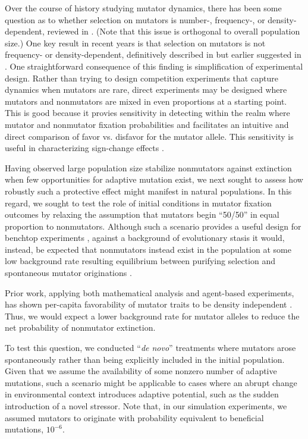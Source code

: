 Over the course of history studying mutator dynamics, there has been some question as to whether selection on mutators is number-, frequency-, or density-dependent, reviewed in \citep{raynes2019selection}.
(Note that this issue is orthogonal to overall population size.)
One key result in recent years is that selection on mutators is not frequency- or density-dependent, definitively described in \citep{raynes2019selection} but earlier suggested in \citep{wylie2009fixation}.
One straightforward consequence of this finding is simplification of experimental design.
Rather than trying to design competition experiments that capture dynamics when mutators are rare, direct experiments may be designed where mutators and nonmutators are mixed in even proportions at a starting point.
This is good because it provies sensitivity in detecting within the realm where mutator and nonmutator fixation probabilities and facilitates an intuitive and direct comparison of favor vs. disfavor for the mutator allele.
This sensitivity is useful in characterizing sign-change effects \citep{raynes2019selection}.



Having observed large population size stabilize nonmutators against extinction when few opportunities for adaptive mutation exist, we next sought to assess how robustly such a protective effect might manifest in natural populations.
In this regard, we sought to test the role of initial conditions in mutator fixation outcomes by relaxing the assumption that mutators begin ``50/50'' in equal proportion to nonmutators.
Although such a scenario provides a useful design for benchtop experiments \citep{raynes2018sign}, against a background of evolutionary stasis it would, instead, be expected that nonmutators instead exist in the population at some low background rate resulting equilibrium between purifying selection and spontaneous mutator originations \citep{desai2011balance,johnson1999approach}.

Prior work, applying both mathematical analysis and agent-based experiments, has shown per-capita favorability of mutator traits to be density independent \citep{raynes2019selection}.
Thus, we would expect a lower background rate for mutator alleles to reduce the net probability of nonmutator extinction.

To test this question, we conducted ``\textit{de novo}'' treatments where mutators arose spontaneously rather than being explicitly included in the initial population.
Given that we assume the availability of some nonzero number of adaptive mutations, such a scenario might be applicable to cases where an abrupt change in environmental context introduces adaptive potential, such as the sudden introduction of a novel stressor.
Note that, in our simulation experiments, we assumed mutators to originate with probability equivalent to beneficial mutations, $10^{-6}$.

